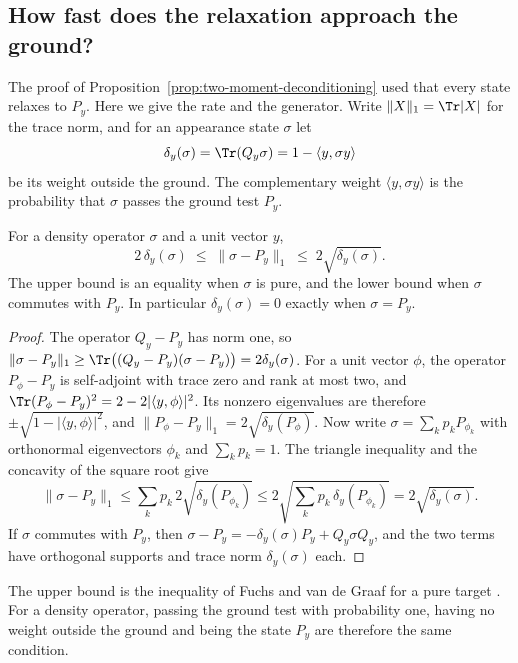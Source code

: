\subsection{How fast does the relaxation approach the ground?}
\label{subsec:relaxation-rate}
The proof of Proposition~\ref{prop:two-moment-deconditioning} used that every state relaxes to $P_y$. Here we give the rate and the generator. Write $\|X\|_1=\Tr|X|$ for the trace norm, and for an appearance state $\sigma$ let
\begin{equation}
 \delta_y(\sigma)=\Tr(Q_y\sigma)=1-\langle y,\sigma y\rangle
 \label{eq:relaxation-deviation}
\end{equation}
be its weight outside the ground. The complementary weight $\langle y,\sigma y\rangle$ is the probability that $\sigma$ passes the ground test $P_y$.

\begin{proposition}
\label{prop:relaxation-pure-distance}
For a density operator $\sigma$ and a unit vector $y$,
\begin{equation}
 2\,\delta_y(\sigma)\;\le\;\|\sigma-P_y\|_1\;\le\;2\sqrt{\delta_y(\sigma)} .
 \label{eq:relaxation-pure-distance}
\end{equation}
The upper bound is an equality when $\sigma$ is pure, and the lower bound when $\sigma$ commutes with $P_y$. In particular $\delta_y(\sigma)=0$ exactly when $\sigma=P_y$.
\end{proposition}
\begin{proof}
The operator $Q_y-P_y$ has norm one, so $\|\sigma-P_y\|_1\ge\Tr\bigl((Q_y-P_y)(\sigma-P_y)\bigr)=2\delta_y(\sigma)$. For a unit vector $\phi$, the operator $P_\phi-P_y$ is self-adjoint with trace zero and rank at most two, and $\Tr(P_\phi-P_y)^2=2-2|\langle y,\phi\rangle|^2$. Its nonzero eigenvalues are therefore $\pm\sqrt{1-|\langle y,\phi\rangle|^2}$, and $\|P_\phi-P_y\|_1=2\sqrt{\delta_y(P_\phi)}$. Now write $\sigma=\sum_k p_kP_{\phi_k}$ with orthonormal eigenvectors $\phi_k$ and $\sum_kp_k=1$. The triangle inequality and the concavity of the square root give
\[
 \|\sigma-P_y\|_1\le\sum_kp_k\,2\sqrt{\delta_y(P_{\phi_k})}
 \le2\sqrt{\textstyle\sum_kp_k\,\delta_y(P_{\phi_k})}=2\sqrt{\delta_y(\sigma)} .
\]
If $\sigma$ commutes with $P_y$, then $\sigma-P_y=-\delta_y(\sigma)P_y+Q_y\sigma Q_y$, and the two terms have orthogonal supports and trace norm $\delta_y(\sigma)$ each.
\end{proof}
The upper bound is the inequality of Fuchs and van de Graaf for a pure target \cite{FuchsVandeGraaf1999}. For a density operator, passing the ground test with probability one, having no weight outside the ground and being the state $P_y$ are therefore the same condition.

